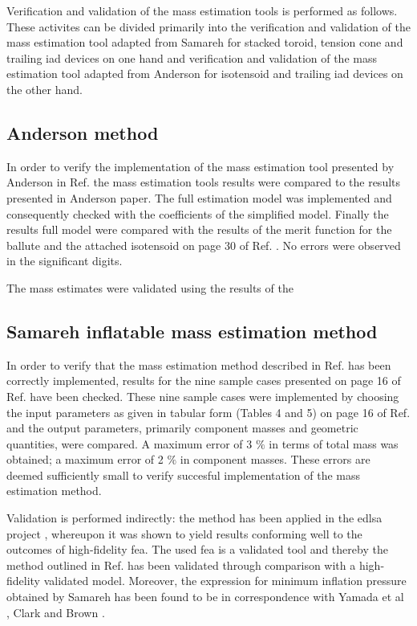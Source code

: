 Verification and validation of the mass estimation tools is performed as follows. These activites can be divided primarily into the verification and validation of the mass estimation tool adapted from Samareh \cite{Samareh2011} for stacked toroid, tension cone and trailing \gls{iad} devices on one hand and verification and validation of the mass estimation tool adapted from Anderson \cite{Anderson1969} for isotensoid and trailing \gls{iad} devices on the other hand. 

\subsection{Anderson method}
In order to verify the implementation of the mass estimation tool presented by Anderson in Ref. \cite{Anderson1969} the mass estimation tools results were compared to the results presented in Anderson paper. The full estimation model was implemented and consequently checked with the coefficients of the simplified model. Finally the results full model were compared with the results of the merit function for the ballute and the attached isotensoid on page 30 of Ref. \cite{Anderson1969}. No errors were observed in the significant digits.

The mass estimates were validated using the results of the

\subsection{Samareh inflatable mass estimation method}
In order to verify that the mass estimation method described in Ref.\cite{Samareh2011} has been correctly implemented, results for the nine sample cases presented on page 16 of Ref.\cite{Samareh2011} have been checked. These nine sample cases were implemented by choosing the input parameters as given in tabular form (Tables 4 and 5) on page 16 of Ref.\cite{Samareh2011} and the output parameters, primarily component masses and geometric quantities, were compared. A maximum error of 3 $\%$ in terms of total mass was obtained; a maximum error of 2 $\%$ in component masses. These errors are deemed sufficiently small to verify succesful implementation of the mass estimation method.

Validation is performed indirectly: the method \cite{Samareh2011} has been applied in the \gls{edlsa} project \cite{Cianciolo2010}, whereupon it was shown to yield results conforming well to the outcomes of high-fidelity \gls{fea}. The used \gls{fea} is a validated tool \cite{Cianciolo2010} and thereby the method outlined in Ref.\cite{Samareh2011} has been validated through comparison with a high-fidelity validated model. Moreover, the expression for minimum inflation pressure obtained by Samareh has been found to be in correspondence with Yamada et al \cite{Yamada2009}, Clark \cite{Clark2009} and Brown \cite{Brown2009}.

